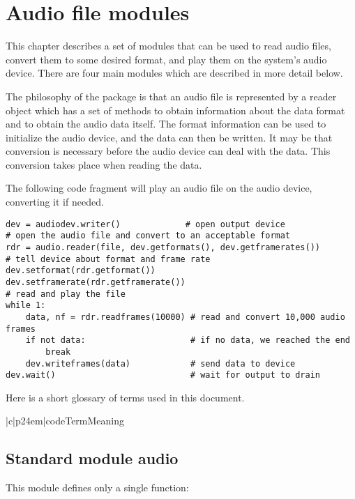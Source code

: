 \chapter{Audio file modules}

This chapter describes a set of modules that can be used to read audio
files, convert them to some desired format, and play them on the
system's audio device.  There are four main modules which are
described in more detail below.

The philosophy of the package is that an audio file is represented by
a reader object which has a set of methods to obtain information about
the data format and to obtain the audio data itself.  The format
information can be used to initialize the audio device, and the data
can then be written.  It may be that conversion is necessary before
the audio device can deal with the data.  This conversion takes place
when reading the data.

The following code fragment will play an audio file on the audio
device, converting it if needed.

\begin{verbatim}
dev = audiodev.writer()             # open output device
# open the audio file and convert to an acceptable format
rdr = audio.reader(file, dev.getformats(), dev.getframerates())
# tell device about format and frame rate
dev.setformat(rdr.getformat())
dev.setframerate(rdr.getframerate())
# read and play the file
while 1:
    data, nf = rdr.readframes(10000) # read and convert 10,000 audio frames
    if not data:                     # if no data, we reached the end
        break
    dev.writeframes(data)            # send data to device
dev.wait()                           # wait for output to drain
\end{verbatim}

Here is a short glossary of terms used in this document.

\begin{tableii}{|c|p{24em}|}{code}{Term}{Meaning}
\end{tableii}

\section{Standard module audio}
\renewcommand{\indexsubitem}{(in module audio)}

This module defines only a single function:


